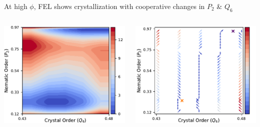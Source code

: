 \documentclass[aspectratio=169]{beamer}
\begin{document}
\begin{frame}[c]{At high $\phi$, FEL shows crystallization with cooperative changes in $P_{2}$ \& $Q_{6}$}

  \begin{columns}[T]

    \centering
    \includegraphics[width=\textwidth]{../figures/fig-pathway_10p25/subfig-pathway_10p25.pdf}

    \centering
    \includegraphics[width=\textwidth]{../figures/ch4_jcp/fig-quivers_10p25/fig-quiver_10p25.pdf}

  \end{columns}

\end{frame}
\end{document}
